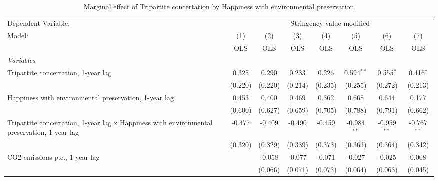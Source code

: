 
\begin{table}[htbp]
   \caption{Marginal effect of Tripartite concertation by Happiness with environmental preservation}
   \centering
   \begin{tabular}{lccccccc}
      \toprule
      Dependent Variable: & \multicolumn{7}{c}{Stringency value modified}\\
      Model:                                                                                      & (1)     & (2)     & (3)          & (4)           & (5)           & (6)           & (7)\\  
                                                                                                  &  OLS    & OLS     & OLS          & OLS           & OLS           & OLS           & OLS\\  
      \midrule
      \emph{Variables}\\
      Tripartite concertation, 1-year lag                                                         & 0.325   & 0.290   & 0.233        & 0.226         & 0.594$^{**}$  & 0.555$^{*}$   & 0.416$^{*}$\\   
                                                                                                  & (0.220) & (0.220) & (0.214)      & (0.235)       & (0.255)       & (0.272)       & (0.213)\\   
      Happiness with environmental preservation, 1-year lag                                       & 0.453   & 0.400   & 0.469        & 0.362         & 0.668         & 0.644         & 0.177\\   
                                                                                                  & (0.600) & (0.627) & (0.659)      & (0.705)       & (0.788)       & (0.791)       & (0.662)\\   
      Tripartite concertation, 1-year lag x Happiness with environmental preservation, 1-year lag & -0.477  & -0.409  & -0.490       & -0.459        & -0.984$^{**}$ & -0.959$^{**}$ & -0.767$^{**}$\\   
                                                                                                  & (0.320) & (0.329) & (0.339)      & (0.373)       & (0.363)       & (0.364)       & (0.342)\\   
      CO2 emissions p.c., 1-year lag                                                              &         & -0.058  & -0.077       & -0.071        & -0.027        & -0.025        & 0.008\\   
                                                                                                  &         & (0.066) & (0.071)      & (0.073)       & (0.064)       & (0.063)       & (0.045)\\   

\end{tabular}
\end{table}
